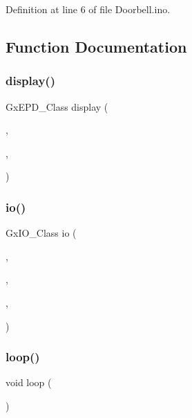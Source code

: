Definition at line 6 of file Doorbell.\+ino.



\subsection{Function Documentation}
\mbox{\label{_doorbell_8ino_a316a5fbb017a97dc4c8a9f1383f7b4b0}} 
\subsubsection{\texorpdfstring{display()}{display()}}
{\footnotesize\ttfamily Gx\+E\+P\+D\+\_\+\+Class display (\begin{DoxyParamCaption}\item[{\mbox{\hyperlink{_doorbell_8ino_acfc2fc23d5e539f2d0b9ed6091a6c24e}{io}}}]{,  }\item[{5}]{,  }\item[{16}]{ }\end{DoxyParamCaption})}

\mbox{\label{_doorbell_8ino_acfc2fc23d5e539f2d0b9ed6091a6c24e}} 
\subsubsection{\texorpdfstring{io()}{io()}}
{\footnotesize\ttfamily Gx\+I\+O\+\_\+\+Class io (\begin{DoxyParamCaption}\item[{S\+PI}]{,  }\item[{15}]{,  }\item[{4}]{,  }\item[{5}]{ }\end{DoxyParamCaption})}

\mbox{\label{_doorbell_8ino_afe461d27b9c48d5921c00d521181f12f}} 
\subsubsection{\texorpdfstring{loop()}{loop()}}
{\footnotesize\ttfamily void loop (\begin{DoxyParamCaption}{ }\end{DoxyParamCaption})}



